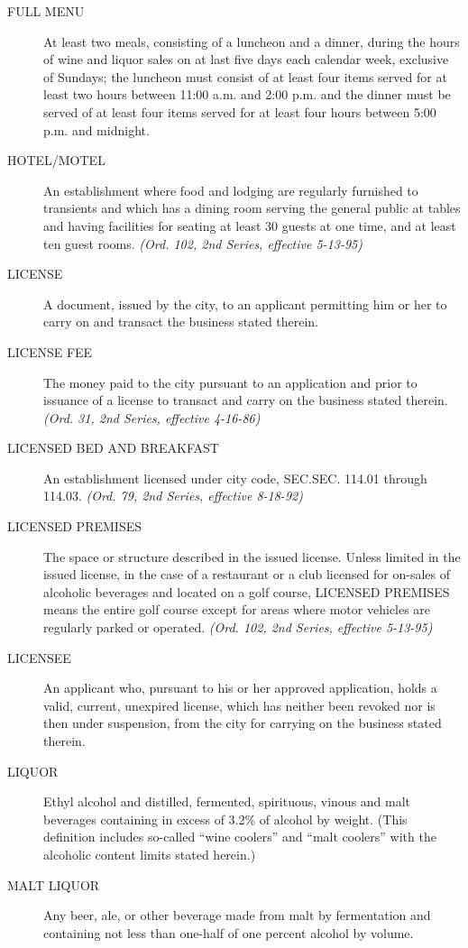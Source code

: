\begin{description}
    \item[FULL MENU] At least two meals, consisting of a luncheon and a dinner, during the hours of wine and liquor sales on at last five days each calendar week, exclusive of Sundays; the luncheon must consist of at least four items served for at least two hours between 11:00 a.m. and 2:00 p.m. and the dinner must be served of at least four items served for at least four hours between 5:00 p.m. and midnight.
    \item[HOTEL/MOTEL] An establishment where food and lodging are regularly furnished to transients and which has a dining room serving the general public at tables and having facilities for seating at least 30 guests at one time, and at least ten guest rooms. \emph{(Ord. 102, 2nd Series, effective 5-13-95)}
    \item[LICENSE] A document, issued by the city, to an applicant permitting him or her to carry on and transact the business stated therein.
    \item[LICENSE FEE] The money paid to the city pursuant to an application and prior to issuance of a license to transact and carry on the business stated therein. \emph{(Ord. 31, 2nd Series, effective 4-16-86)}
    \item[LICENSED BED AND BREAKFAST] An establishment licensed under city code, SEC.SEC. 114.01 through 114.03. \emph{(Ord. 79, 2nd Series, effective 8-18-92)}
    \item[LICENSED PREMISES] The space or structure described in the issued license.  Unless limited in the issued license, in the case of a restaurant or a club licensed for on-sales of alcoholic beverages and located on a golf course, LICENSED PREMISES means the entire golf course except for areas where motor vehicles are regularly parked or operated. \emph{(Ord. 102, 2nd Series, effective 5-13-95)}
    \item[LICENSEE] An applicant who, pursuant to his or her approved application, holds a valid, current, unexpired license, which has neither been revoked nor is then under suspension, from the city for carrying on the business stated therein.
    \item[LIQUOR] Ethyl alcohol and distilled, fermented, spirituous, vinous and malt beverages containing in excess of 3.2\% of alcohol by weight. (This definition includes so-called “wine coolers” and “malt coolers” with the alcoholic content limits stated herein.)
    \item[MALT LIQUOR] Any beer, ale, or other beverage made from malt by fermentation and containing not less than one-half of one percent alcohol by volume.

\end{description}
